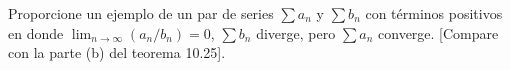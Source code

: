 \item Proporcione un ejemplo de un par de series $\sum a_n$ y $\sum b_n$ con términos positivos en donde $\lim_{n \to \infty} (a_n/b_n) = 0$, $\sum b_n$ diverge, pero $\sum a_n$ converge. [Compare con la parte (b) del teorema 10.25].
